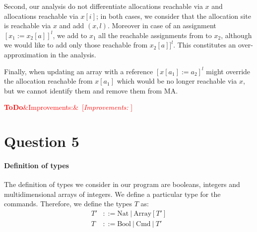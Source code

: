 \documentclass{article}
\newcommand{\todo}[1]{\textcolor{red}{\textbf{ToDo}\ifx&#1&\else ~[\emph{#1} ]~\fi}}
\begin{document}
Second, our analysis do not differentiate allocations reachable via \(x\) and allocations reachable via \(x[i]\); in both cases, we consider that the allocation site is reachable via \(x\) and add \((x,l)\).
Moreover in case of an assignment \([x_1 := x_2[a]]^l\), we add to \(x_1\) all the reachable assignments from to \(x_2\), although we would like to add only those reachable from \(x_2[a]]^l\).
This constitutes an over-approximation in the analysis.

Finally, when updating an array with a reference \([x[a_1] := a_2]^l\) might override the allocation reachable from \(x[a_1]\) which would be no longer reachable via \(x\), but we cannot identify them and remove them from MA.

\todo{Improvements:}


\section*{Question 5}
\paragraph{Definition of types}
The definition of types we consider in our program are booleans, integers and multidimensional arrays of integers. We define a particular type for the commands. Therefore, we define the types \(T\) as:
\begin{equation*} \label{eq1}
\begin{split}
T' & ::= \text{Nat}\ |\ \text{Array}[T']\\
T  & ::= \text{Bool}\ |\ \text{Cmd}\ |\ T'
\end{split}
\end{equation*}
\end{document}
